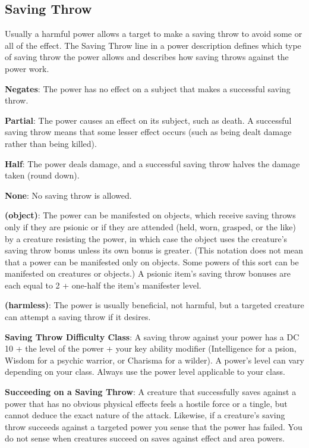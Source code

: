 \subsection{Saving Throw}
Usually a harmful power allows a target to make a saving throw to avoid some or all of the effect. The Saving Throw line in a power description defines which type of saving throw the power allows and describes how saving throws against the power work.

\textbf{Negates}: The power has no effect on a subject that makes a successful saving throw.

\textbf{Partial}: The power causes an effect on its subject, such as death. A successful saving throw means that some lesser effect occurs (such as being dealt damage rather than being killed).

\textbf{Half}: The power deals damage, and a successful saving throw halves the damage taken (round down).

\textbf{None}: No saving throw is allowed.

\textbf{(object)}: The power can be manifested on objects, which receive saving throws only if they are psionic or if they are attended (held, worn, grasped, or the like) by a creature resisting the power, in which case the object uses the creature's saving throw bonus unless its own bonus is greater. (This notation does not mean that a power can be manifested only on objects. Some powers of this sort can be manifested on creatures or objects.) A psionic item's saving throw bonuses are each equal to 2 + one-half the item's manifester level.

\textbf{(harmless)}: The power is usually beneficial, not harmful, but a targeted creature can attempt a saving throw if it desires.

\textbf{Saving Throw Difficulty Class}: A saving throw against your power has a DC 10 + the level of the power + your key ability modifier (Intelligence for a psion, Wisdom for a psychic warrior, or Charisma for a wilder). A power's level can vary depending on your class. Always use the power level applicable to your class.

\textbf{Succeeding on a Saving Throw}: A creature that successfully saves against a power that has no obvious physical effects feels a hostile force or a tingle, but cannot deduce the exact nature of the attack. Likewise, if a creature's saving throw succeeds against a targeted power you sense that the power has failed. You do not sense when creatures succeed on saves against effect and area powers.

